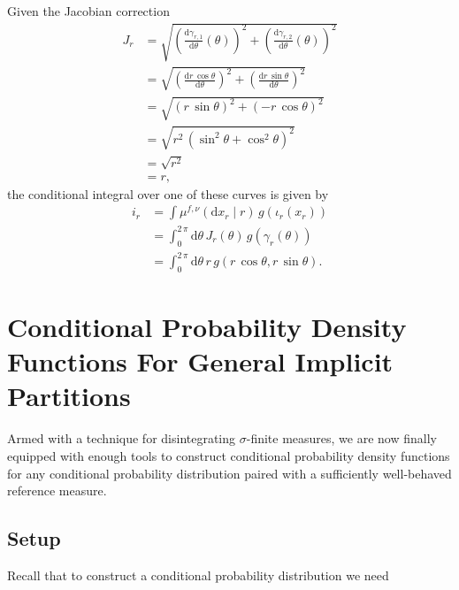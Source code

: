 \documentclass[
  letterpaper,
  DIV=11,
  numbers=noendperiod]{scrartcl}
\begin{document}
Given the Jacobian correction \begin{align*}
J_{r}
&=
\sqrt{
  \left(
    \frac{
      \mathrm{d} \gamma_{r, 1}
    }{
      \mathrm{d} \theta
    } ( \theta )
  \right)^{2}
  +
  \left(
    \frac{
      \mathrm{d} \gamma_{r, 2}
    }{
      \mathrm{d} \theta
    } ( \theta )
  \right)^{2}
}
\\
&=
\sqrt{
  \left(
    \frac{
      \mathrm{d} r \, \cos \theta
    }{
      \mathrm{d} \theta
    }
  \right)^{2}
  +
  \left(
    \frac{
      \mathrm{d} r \, \sin \theta
    }{
      \mathrm{d} \theta
    }
  \right)^{2}
}
\\
&=
\sqrt{
  \left(
    r \, \sin \theta
  \right)^{2}
  +
  \left(
    - r \, \cos \theta
  \right)^{2}
}
\\
&=
\sqrt{
  r^{2} \,
  \left(
    \sin^{2} \theta + \cos^{2} \theta
  \right)^{2}
}
\\
&=
\sqrt{
  r^{2}
}
\\
&=
r,
\end{align*} the conditional integral over one of these curves is given
by \begin{align*}
i_{r}
&=
\int \mu^{f, \nu}( \mathrm{d} x_{r} \mid r ) \,
g(\iota_{r}(x_{r}))
\\
&=
\int_{0}^{2 \, \pi} \mathrm{d} \theta \,
J_{r}(\theta) \, g( \gamma_{r}(\theta) )
\\
&=
\int_{0}^{2 \, \pi} \mathrm{d} \theta \,
r \, g( r \, \cos \theta, r \, \sin \theta ).
\end{align*}

\section{Conditional Probability Density Functions For General Implicit
Partitions}\label{conditional-probability-density-functions-for-general-implicit-partitions}

Armed with a technique for disintegrating \(\sigma\)-finite measures, we
are now finally equipped with enough tools to construct conditional
probability density functions for any conditional probability
distribution paired with a sufficiently well-behaved reference measure.

\subsection{Setup}\label{setup}

Recall that to construct a conditional probability distribution we need
\end{document}
